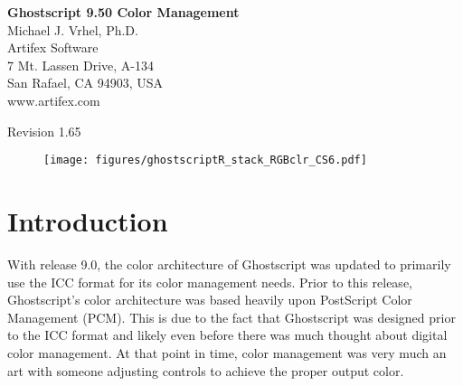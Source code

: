 \documentclass[12pt,notitlepage]{article}
\begin{document}
\begin{titlepage}

\begin{center}{\huge \bf Ghostscript 9.50 Color Management\\} \vspace{0.5in} {\Large Michael J.
Vrhel, Ph.D.\\} {\Large Artifex Software\\} {\Large 7 Mt. Lassen Drive, A-134\\} {\Large San Rafael, CA 94903, USA\\}
{\Large www.artifex.com\\}
\end{center}
\vspace*{0.5in}
\begin{abstract}
This document provides information about the color architecture in Ghostscript 9.50. The document is suitable for users who wish to
obtain accurate color with their output device as well as for developers who wish to customize Ghostscript to achieve a higher
level of control and/or interface with a different color management module.
\end{abstract}
\begin{center}
\vspace*{0.25in}
Revision 1.65
\vspace*{0.25in}
\capstartfalse
\begin{figure}[h]
    \begin{center}
\texttt{[image: figures/ghostscriptR\_stack\_RGBclr\_CS6.pdf]}
    \end{center}
\end{figure}
\capstarttrue

\end{center}

\end{titlepage}

\renewcommand{\baselinestretch}{1.67}\normalsize

\clearpage

\singlespace

\section{Introduction}

With release 9.0, the color architecture of Ghostscript was updated to primarily use the ICC\cite{ICC} format for its color management needs.  Prior to this release, Ghostscript's color architecture was based heavily upon PostScript\cite{PS} Color Management (PCM).  This is due to the fact that Ghostscript was designed prior to the ICC format and likely even before there was much thought about digital color management.  At that point in time, color management was very much an art with someone adjusting controls to achieve the proper output color.
\end{document}
